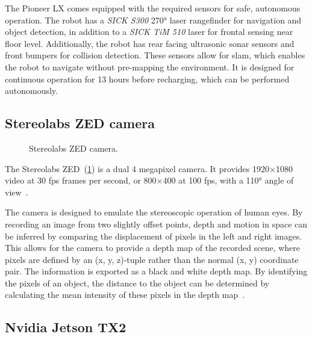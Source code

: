 \documentclass[\rootfolder/main.tex]{subfiles}
\begin{document}
The Pioneer LX comes equipped with the required sensors for safe, autonomous operation.
The robot has a \emph{SICK S300} \ang{270} laser rangefinder for navigation and object detection, in addition to a \emph{SICK TiM 510} laser for frontal sensing near floor level.
Additionally, the robot has rear facing ultrasonic sonar sensors and front bumpers for collision detection.
These sensors allow for \acrfull{slam}, which enables the robot to navigate without pre-mapping the environment.
It is designed for continuous operation for 13 hours before recharging, which can be performed autonomously.


\subsection{Stereolabs ZED camera}

\begin{figure}[h]
    \caption{Stereolabs ZED camera.}
    \label{fig:zed-camera}
\end{figure}

The Stereolabs ZED~(\cref{fig:zed-camera}) is a dual 4 megapixel camera.
It provides 1920$\times$1080 video at 30 \acrfull{fps} frames per second, or 800$\times$400 at 100 \acrshort{fps}, with a \ang{110} angle of view~\cite{Stereolabs}.

The camera is designed to emulate the stereoscopic operation of human eyes.
By recording an image from two slightly offset points, depth and motion in space can be inferred by comparing the displacement of pixels in the left and right images.
This allows for the camera to provide a depth map of the recorded scene, where pixels are defined by an (x, y, z)-tuple rather than the normal (x, y) coordinate pair.
The information is exported as a black and white depth map.
By identifying the pixels of an object, the distance to the object can be determined by calculating the mean intensity of these pixels in the depth map~\cite{Stereolabs}.


\subsection{Nvidia Jetson TX2}
\end{document}
